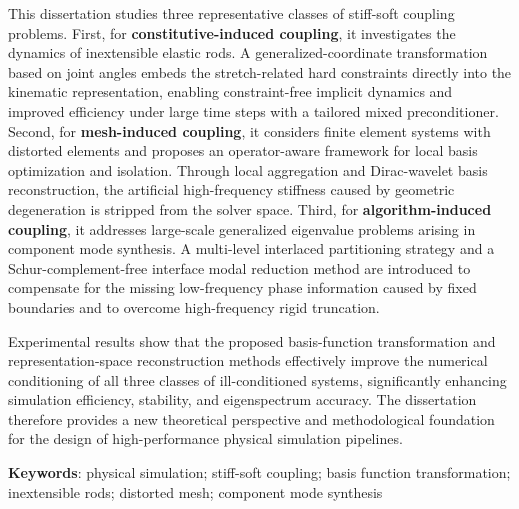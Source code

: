 This dissertation studies three representative classes of stiff-soft coupling problems. First, for \textbf{constitutive-induced coupling}, it investigates the dynamics of inextensible elastic rods. A generalized-coordinate transformation based on joint angles embeds the stretch-related hard constraints directly into the kinematic representation, enabling constraint-free implicit dynamics and improved efficiency under large time steps with a tailored mixed preconditioner. Second, for \textbf{mesh-induced coupling}, it considers finite element systems with distorted elements and proposes an operator-aware framework for local basis optimization and isolation. Through local aggregation and Dirac-wavelet basis reconstruction, the artificial high-frequency stiffness caused by geometric degeneration is stripped from the solver space. Third, for \textbf{algorithm-induced coupling}, it addresses large-scale generalized eigenvalue problems arising in component mode synthesis. A multi-level interlaced partitioning strategy and a Schur-complement-free interface modal reduction method are introduced to compensate for the missing low-frequency phase information caused by fixed boundaries and to overcome high-frequency rigid truncation.

Experimental results show that the proposed basis-function transformation and representation-space reconstruction methods effectively improve the numerical conditioning of all three classes of ill-conditioned systems, significantly enhancing simulation efficiency, stability, and eigenspectrum accuracy. The dissertation therefore provides a new theoretical perspective and methodological foundation for the design of high-performance physical simulation pipelines.

\bigskip
\noindent \textbf{Keywords}: physical simulation; stiff-soft coupling; basis function transformation; inextensible rods; distorted mesh; component mode synthesis
